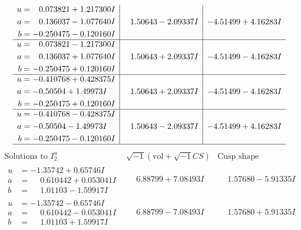\documentclass[1p]{elsarticle_modified}
\theoremstyle{definition}
\newcommand{\I}{\sqrt{-1}}
\begin{document}
$$\begin{array}{c|c|c}
\begin{aligned}
u &= \phantom{-}0.073821 + 1.217300 I \\
a &= \phantom{-}0.136037 - 1.077640 I \\
b &= -0.250475 - 0.120160 I\end{aligned}
 & \phantom{-}1.50643 - 2.09337 I & -4.51499 + 4.16283 I \\ \hline\begin{aligned}
u &= \phantom{-}0.073821 - 1.217300 I \\
a &= \phantom{-}0.136037 + 1.077640 I \\
b &= -0.250475 + 0.120160 I\end{aligned}
 & \phantom{-}1.50643 + 2.09337 I & -4.51499 - 4.16283 I \\ \hline\begin{aligned}
u &= -0.410768 + 0.428375 I \\
a &= -0.50504 + 1.49973 I \\
b &= -0.250475 + 0.120160 I\end{aligned}
 & \phantom{-}1.50643 + 2.09337 I & -4.51499 - 4.16283 I \\ \hline\begin{aligned}
u &= -0.410768 - 0.428375 I \\
a &= -0.50504 - 1.49973 I \\
b &= -0.250475 - 0.120160 I\end{aligned}
 & \phantom{-}1.50643 - 2.09337 I & -4.51499 + 4.16283 I\\
 \hline 
 \end{array}$$\newpage$$\begin{array}{c|c|c}  
\text{Solutions to }I^u_{2}& \I (\text{vol} + \sqrt{-1}CS) & \text{Cusp shape}\\
 \hline 
\begin{aligned}
u &= -1.35742 + 0.65746 I \\
a &= \phantom{-}0.610442 + 0.053041 I \\
b &= \phantom{-}1.01103 - 1.59917 I\end{aligned}
 & \phantom{-}6.88799 + 7.08493 I & \phantom{-}1.57680 - 5.91335 I \\ \hline\begin{aligned}
u &= -1.35742 - 0.65746 I \\
a &= \phantom{-}0.610442 - 0.053041 I \\
b &= \phantom{-}1.01103 + 1.59917 I\end{aligned}
 & \phantom{-}6.88799 - 7.08493 I & \phantom{-}1.57680 + 5.91335 I \\ \hline\begin{aligned}

\end{aligned}
\end{array}$$
\end{document}
